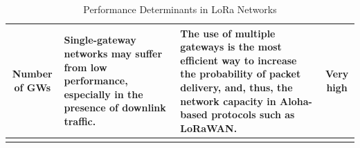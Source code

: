 \documentclass[a4paper,twoside,12pt]{report}
\begin{document}
\begin{longtable}{|c|p{6cm}|p{4cm}|c|}
\hline
Number of GWs & Single-gateway networks may suffer from low performance, especially in the presence of downlink traffic. & The use of multiple gateways is the most efficient way to increase the probability of packet delivery, and, thus, the network capacity in Aloha-based protocols such as LoRaWAN. & Very high \\
\hline
\caption{Performance Determinants in LoRa Networks}
\label{tab:performance-determinants}
\end{longtable}

\nocite{*}

\end{document}
